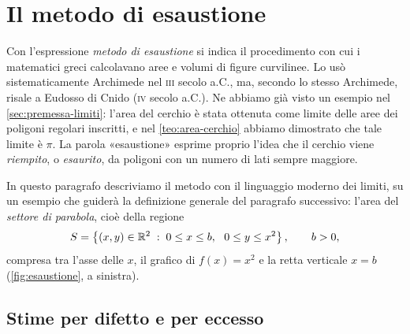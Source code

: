 \section{Il metodo di esaustione}
\label{sec:esaustione}

Con l'espressione \emph{metodo di esaustione} si indica il
procedimento con cui i matematici greci calcolavano aree e volumi di figure
curvilinee. Lo usò sistematicamente Archimede nel \textsc{iii} secolo a.C., ma, secondo
lo stesso Archimede, risale a Eudosso di Cnido (\textsc{iv} secolo a.C.). Ne abbiamo già
visto un esempio nel \cref{sec:premessa-limiti}: l'area del cerchio è stata ottenuta
come limite delle aree dei poligoni regolari inscritti, e nel \cref{teo:area-cerchio}
abbiamo dimostrato che tale limite è $\pi$. La parola «esaustione» esprime proprio
l'idea che il cerchio viene \emph{riempito}, o \emph{esaurito}, da poligoni con un
numero di lati sempre maggiore.

In questo paragrafo descriviamo il metodo con il linguaggio moderno dei limiti, su un
esempio che guiderà la definizione generale del paragrafo successivo: l'area del
\emph{settore di parabola}, cioè della regione
\begin{equation}\label{eq:settore-parabola}
  S=\left\{ (x,y)\in\mathbb{R}^{2} \;:\; 0\le x\le b,\ \ 0\le y\le x^{2} \right\}, \qquad b>0,
\end{equation}
compresa tra l'asse delle $x$, il grafico di $f(x)=x^{2}$ e la retta verticale $x=b$
(\cref{fig:esaustione}, a sinistra).

\subsection{Stime per difetto e per eccesso}


